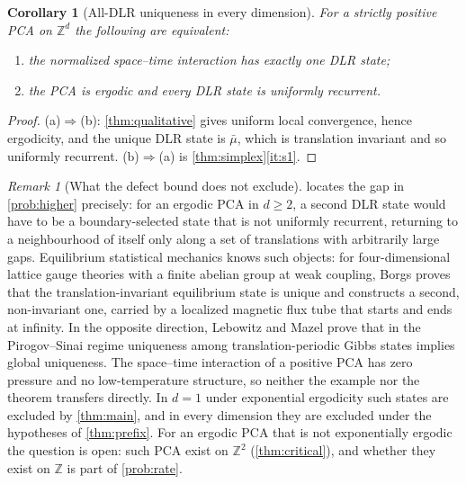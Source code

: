 \documentclass[11pt]{article}
\theoremstyle{plain}
\newtheorem{corollary}[theorem]{Corollary}
\theoremstyle{definition}
\theoremstyle{remark}
\newtheorem{remark}[theorem]{Remark}
\newcommand{\Z}{\mathbb{Z}}
\newcommand{\ba}{\bar{\mu}}
\begin{document}
\begin{corollary}[All-DLR uniqueness in every dimension]
\label{cor:allDLR}
For a strictly positive PCA on $\Z^d$ the following are equivalent:
\begin{enumerate}[label=(\alph*)]
\item the normalized space--time interaction has exactly one DLR state;
\item the PCA is ergodic and every DLR state is uniformly recurrent.
\end{enumerate}
\end{corollary}

\begin{proof}
(a)$\Rightarrow$(b): \cref{thm:qualitative} gives uniform local convergence, hence ergodicity, and the unique DLR state is $\ba$, which is translation invariant and so uniformly recurrent. (b)$\Rightarrow$(a) is \cref{thm:simplex}\ref{it:s1}.
\end{proof}

\begin{remark}[What the defect bound does not exclude]
\label{rem:notexcluded}
 locates the gap in \cref{prob:higher} precisely: for an ergodic PCA in $d\ge2$, a second DLR state would have to be a boundary-selected state that is not uniformly recurrent, returning to a neighbourhood of itself only along a set of translations with arbitrarily large gaps. Equilibrium statistical mechanics knows such objects: for four-dimensional lattice gauge theories with a finite abelian group at weak coupling, Borgs \cite{Borgs84} proves that the translation-invariant equilibrium state is unique and constructs a second, non-invariant one, carried by a localized magnetic flux tube that starts and ends at infinity. In the opposite direction, Lebowitz and Mazel \cite{LM97} prove that in the Pirogov--Sinai regime uniqueness among translation-periodic Gibbs states implies global uniqueness. The space--time interaction of a positive PCA has zero pressure and no low-temperature structure, so neither the example nor the theorem transfers directly. In $d=1$ under exponential ergodicity such states are excluded by \cref{thm:main}, and in every dimension they are excluded under the hypotheses of \cref{thm:prefix}. For an ergodic PCA that is not exponentially ergodic the question is open: such PCA exist on $\Z^2$ (\cref{thm:critical}), and whether they exist on $\Z$ is part of \cref{prob:rate}.
\end{remark}

\end{document}
